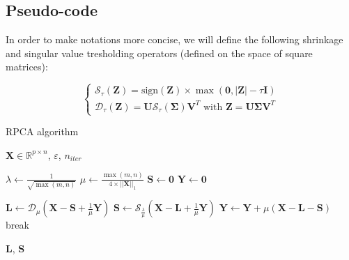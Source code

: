 \documentclass[sigconf]{acmart}
\newcommand{\sign}{\text{sign}}
\begin{document}
\subsection{Pseudo-code}

In order to make notations more concise, we will define the following shrinkage and singular value tresholding operators (defined on the space of square matrices):

\begin{equation*}
  \begin{cases}
    \mathcal{S}_{\tau}(\mathbf{Z}) = \sign{(\mathbf{Z})} \times \max{(\mathbf{0}, |\mathbf{Z}| - \tau \mathbf{I})} \\
      \mathcal{D}_{\tau}(\mathbf{Z}) = \mathbf{U} \mathcal{S}_{\tau}(\mathbf{\Sigma}) \mathbf{V}^T \text{ with } \mathbf{Z} = \mathbf{U} \mathbf{\Sigma} \mathbf{V}^T
  \end{cases}
\end{equation*}

\begin{algorithm}
  \caption{RPCA algorithm}\label{alg:rpca}
  \begin{algorithmic}
      \Require $\mathbf{X} \in \mathbb{R}^{p \times n}$, $\varepsilon$, $n_{iter}$
      
      \State $\lambda \gets \frac{1}{\sqrt{\max(m, n)}}$
      \State $\mu \gets \frac{\max(m, n)}{4 \times ||\mathbf{X}||_1}$
      \State $\mathbf{S} \gets \mathbf{0}$
      \State $\mathbf{Y} \gets \mathbf{0}$
      
          \State $\mathbf{L} \gets \mathcal{D}_{\mu}(\mathbf{X} - \mathbf{S} + \frac{1}{\mu} \mathbf{Y})$
          \State $\mathbf{S} \gets \mathcal{S}_{\frac{\lambda}{\mu}} (\mathbf{X} - \mathbf{L} + \frac{1}{\mu} \mathbf{Y})$ 
          \State $\mathbf{Y} \gets \mathbf{Y} + \mu(\mathbf{X} - \mathbf{L} - \mathbf{S})$
              \State break\
          \EndIf
      \EndFor
      
      \State \Return $\mathbf{L}$, $\mathbf{S}$
  \end{algorithmic}
  \end{algorithm}
  
\end{document}
